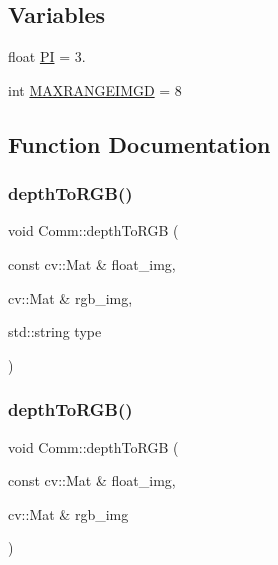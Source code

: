 \subsection*{Variables}
\begin{DoxyCompactItemize}
\item 
float \hyperlink{namespace_comm_a7d4da4b3fc818fb4d75a7df90df80152}{PI} = 3.
\item 
int \hyperlink{namespace_comm_a8f60d778070dabbe4b6fa39157309097}{M\+A\+X\+R\+A\+N\+G\+E\+I\+M\+GD} = 8
\end{DoxyCompactItemize}


\subsection{Function Documentation}
\mbox{\label{namespace_comm_ad99fee34a48e5331dfa18b2b766e7df2}} 
\subsubsection{\texorpdfstring{depth\+To\+R\+G\+B()}{depthToRGB()}\hspace{0.1cm}{\footnotesize\ttfamily [1/2]}}
{\footnotesize\ttfamily void Comm\+::depth\+To\+R\+GB (\begin{DoxyParamCaption}\item[{const cv\+::\+Mat \&}]{float\+\_\+img,  }\item[{cv\+::\+Mat \&}]{rgb\+\_\+img,  }\item[{std\+::string}]{type }\end{DoxyParamCaption})}

\mbox{\label{namespace_comm_afe46bbd9c6bec183b93879e39e21fcbc}} 
\subsubsection{\texorpdfstring{depth\+To\+R\+G\+B()}{depthToRGB()}\hspace{0.1cm}{\footnotesize\ttfamily [2/2]}}
{\footnotesize\ttfamily void Comm\+::depth\+To\+R\+GB (\begin{DoxyParamCaption}\item[{const cv\+::\+Mat \&}]{float\+\_\+img,  }\item[{cv\+::\+Mat \&}]{rgb\+\_\+img }\end{DoxyParamCaption})}



